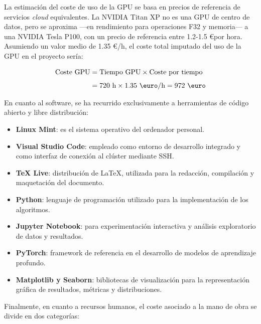 \begin{itemize}
    La estimación del coste de uso de la GPU se basa en precios de referencia de servicios \textit{cloud} equivalentes. La NVIDIA Titan XP no es una GPU de centro de datos, pero se aproxima ---en rendimiento para operaciones F32 y memoria--- a una NVIDIA Tesla P100, con un precio de referencia entre 1.2-1.5 \euro por hora. Asumiendo un valor medio de 1.35 \euro/h, el coste total imputado del uso de la GPU en el proyecto sería:

    \begin{align*}
        \textnormal{Coste GPU} &= \textnormal{Tiempo GPU} \times \textnormal{Coste por tiempo} \\[1ex]
        &= 720\text{ h} \times 1.35 \text{ \euro/h} = 972 \text{ \euro}
    \end{align*}

\end{itemize}

En cuanto al software, se ha recurrido exclusivamente a herramientas de código abierto y libre distribución:

\begin{itemize}
    \item \textbf{Linux Mint}: es el sistema operativo del ordenador personal. 
    \item \textbf{Visual Studio Code}: empleado como entorno de desarrollo integrado y como interfaz de conexión al clúster mediante \acrshort{SSH}.
    \item \textbf{TeX Live}: distribución de \LaTeX, utilizada para la redacción, compilación y maquetación del documento.
    \item \textbf{Python}: lenguaje de programación utilizado para la implementación de los algoritmos.
    \item \textbf{Jupyter Notebook}: para experimentación interactiva y análisis exploratorio de datos y resultados.
    \item \textbf{PyTorch}: framework de referencia en el desarrollo de modelos de aprendizaje profundo.
    \item \textbf{Matplotlib y Seaborn}: bibliotecas de visualización para la representación gráfica de resultados, métricas y distribuciones.
\end{itemize}

Finalmente, en cuanto a recursos humanos, el coste asociado a la mano de obra se divide en dos categorías: 

